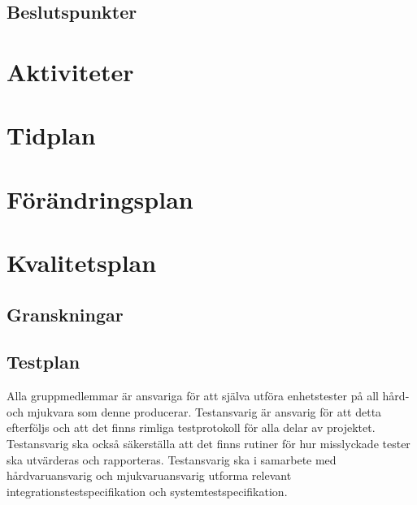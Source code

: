 \documentclass[a4paper,11pt]{article}
\begin{document}
\subsection{Beslutspunkter}
\begin{flushleft}
\begin{LIPSbeslutspunkter}
\end{LIPSbeslutspunkter}
\end{flushleft}

\section{Aktiviteter}

\section{Tidplan}

\section{Förändringsplan}

\section{Kvalitetsplan}
\subsection{Granskningar}

\subsection{Testplan}
Alla gruppmedlemmar är ansvariga för att själva utföra enhetstester på all hård- och mjukvara som denne producerar. Testansvarig är ansvarig för att detta efterföljs och att det finns rimliga testprotokoll för alla delar av projektet. Testansvarig ska också säkerställa att det finns rutiner för hur misslyckade tester ska utvärderas och rapporteras. Testansvarig ska i samarbete med hårdvaruansvarig och mjukvaruansvarig utforma relevant integrationstestspecifikation och systemtestspecifikation.
\end{document}
